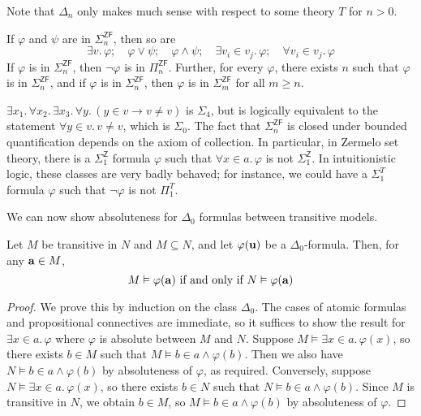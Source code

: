 Note that \( \Delta_n \) only makes much sense with respect to some theory \( T \) for \( n > 0 \).
\begin{lemma}
    If \( \varphi \) and \( \psi \) are in \( \Sigma_n^{\mathsf{ZF}} \), then so are
    \[ \exists v.\, \varphi;\quad \varphi \vee \psi;\quad \varphi \wedge \psi;\quad \exists v_i \in v_j.\, \varphi;\quad \forall v_i \in v_j.\, \varphi \]
    If \( \varphi \) is in \( \Sigma_n^{\mathsf{ZF}} \), then \( \neg\varphi \) is in \( \Pi_n^{\mathsf{ZF}} \).
    Further, for every \( \varphi \), there exists \( n \) such that \( \varphi \) is in \( \Sigma_n^{\mathsf{ZF}} \), and if \( \varphi \) is in \( \Sigma_n^{\mathsf{ZF}} \), then \( \varphi \) is in \( \Sigma_m^{\mathsf{ZF}} \) for all \( m \geq n \).
\end{lemma}
\begin{remark}
    \( \exists x_1.\, \forall x_2.\, \exists x_3.\, \forall y.\, (y \in v \to v \neq v) \) is \( \Sigma_4 \), but is logically equivalent to the statement \( \forall y \in v.\, v \neq v \), which is \( \Sigma_0 \).
    The fact that \( \Sigma_n^{\mathsf{ZF}} \) is closed under bounded quantification depends on the axiom of collection.
    In particular, in Zermelo set theory, there is a \( \Sigma_1^{\mathsf{Z}} \) formula \( \varphi \) such that \( \forall x \in a.\, \varphi \) is not \( \Sigma_1^{\mathsf{Z}} \).
    In intuitionistic logic, these classes are very badly behaved; for instance, we could have a \( \Sigma_1^T \) formula \( \varphi \) such that \( \neg\varphi \) is not \( \Pi_1^T \).
\end{remark}
We can now show absoluteness for \( \Delta_0 \) formulas between transitive models.
\begin{theorem}
    Let \( M \) be transitive in \( N \) and \( M \subseteq N \), and let \( \varphi(\vb u) \) be a \( \Delta_0 \)-formula.
    Then, for any \( \vb a \in M \),
    \[ M \vDash \varphi(\vb a) \text{ if and only if } N \vDash \varphi(\vb a) \]
\end{theorem}
\begin{proof}
    We prove this by induction on the class \( \Delta_0 \).
    The cases of atomic formulas and propositional connectives are immediate, so it suffices to show the result for \( \exists x \in a.\, \varphi \) where \( \varphi \) is absolute between \( M \) and \( N \).
    Suppose \( M \vDash \exists x \in a.\, \varphi(x) \), so there exists \( b \in M \) such that \( M \vDash b \in a \wedge \varphi(b) \).
    Then we also have \( N \vDash b \in a \wedge \varphi(b) \) by absoluteness of \( \varphi \), as required.
    Conversely, suppose \( N \vDash \exists x \in a.\, \varphi(x) \), so there exists \( b \in N \) such that \( N \vDash b \in a \wedge \varphi(b) \).
    Since \( M \) is transitive in \( N \), we obtain \( b \in M \), so \( M \vDash b \in a \wedge \varphi(b) \) by absoluteness of \( \varphi \).
\end{proof}
